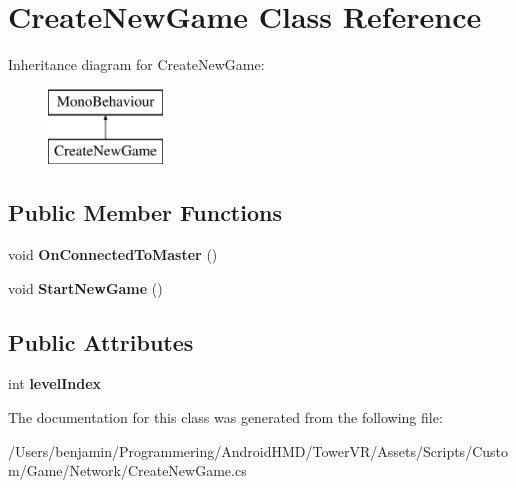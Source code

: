 \hypertarget{class_create_new_game}{}\section{Create\+New\+Game Class Reference}
\label{class_create_new_game}
Inheritance diagram for Create\+New\+Game\+:\begin{figure}[H]
\begin{center}
\leavevmode
\includegraphics[height=2.000000cm]{class_create_new_game}
\end{center}
\end{figure}
\subsection*{Public Member Functions}
\begin{DoxyCompactItemize}
\item 
void {\bfseries On\+Connected\+To\+Master} ()\hypertarget{class_create_new_game_a0c56a6fe55651aac5376725ffc2f9c0f}{}\label{class_create_new_game_a0c56a6fe55651aac5376725ffc2f9c0f}

\item 
void {\bfseries Start\+New\+Game} ()\hypertarget{class_create_new_game_a2d91e99dfaf2b9e3a91a176314df25f0}{}\label{class_create_new_game_a2d91e99dfaf2b9e3a91a176314df25f0}

\end{DoxyCompactItemize}
\subsection*{Public Attributes}
\begin{DoxyCompactItemize}
\item 
int {\bfseries level\+Index}\hypertarget{class_create_new_game_afa202fe11d0d8a8c6468291951593d38}{}\label{class_create_new_game_afa202fe11d0d8a8c6468291951593d38}

\end{DoxyCompactItemize}


The documentation for this class was generated from the following file\+:\begin{DoxyCompactItemize}
\item 
/\+Users/benjamin/\+Programmering/\+Android\+H\+M\+D/\+Tower\+V\+R/\+Assets/\+Scripts/\+Custom/\+Game/\+Network/Create\+New\+Game.\+cs\end{DoxyCompactItemize}
